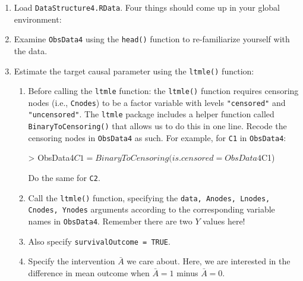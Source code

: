 \documentclass{exam}
\newenvironment{packed_item}{
\begin{itemize}
 \setlength{\itemsep}{0pt}
  \setlength{\parskip}{0pt}
  \setlength{\parsep}{0pt}
}{\end{itemize}}
\begin{document}
\begin{enumerate}
\item Load \texttt{DataStructure4.RData}. Four things should come up in your global environment:
\item Examine \texttt{ObsData4} using the \texttt{head()} function to re-familiarize yourself with the data.
\item Estimate the target causal parameter using the \texttt{ltmle()} function:
\begin{enumerate}
\item Before calling the \texttt{ltmle} function: the \texttt{ltmle()} function requires censoring nodes (i.e., \texttt{Cnodes}) to be a factor variable with levels \texttt{"censored"} and \texttt{"uncensored"}. The \texttt{ltmle} package includes a helper function called \texttt{BinaryToCensoring()} that allows us to do this in one line. Recode the censoring nodes in \texttt{ObsData4} as such. For example, for \texttt{C1} in \texttt{ObsData4}:
\begin{Schunk}
\begin{Sinput}
> ObsData4$C1 = BinaryToCensoring(is.censored = ObsData4$C1)
\end{Sinput}
\end{Schunk}
Do the same for \texttt{C2}.
\item Call the \texttt{ltmle()} function, specifying the \texttt{data, Anodes, Lnodes, Cnodes, Ynodes} arguments according to the corresponding variable names in \texttt{ObsData4}. Remember there are two $Y$ values here!
\item Also specify \texttt{survivalOutcome = TRUE}.
\item Specify the intervention $\bar{A}$ we care about. Here, we are interested in the difference in mean outcome when $\bar{A} = 1$ minus $\bar{A} = 0$. 

\end{enumerate}
\end{enumerate}
\end{document}
